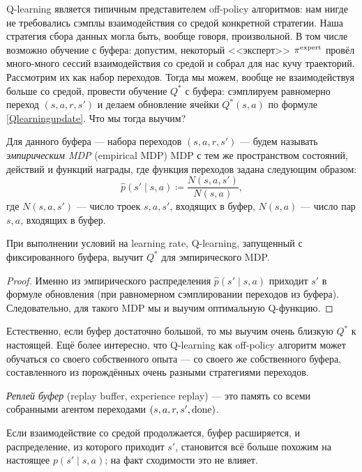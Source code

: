 Q-learning является типичным представителем off-policy алгоритмов: нам нигде не требовались сэмплы взаимодействия со средой конкретной стратегии. Наша стратегия сбора данных могла быть, вообще говоря, произвольной. В том числе возможно обучение с буфера: допустим, некоторый <<эксперт>> $\pi^{\mathrm{expert}}$ провёл много-много сессий взаимодействия со средой и собрал для нас кучу траекторий. Рассмотрим их как набор переходов. Тогда мы можем, вообще не взаимодействуя больше со средой, провести обучение $Q^*$ с буфера: сэмплируем равномерно переход $(s, a, r, s')$ и делаем обновление ячейки $Q^*(s, a)$ по формуле \eqref{Qlearningupdate}. Что мы тогда выучим?

\begin{definition}
Для данного буфера --- набора переходов $(s, a, r, s')$ --- будем называть \emph{эмпирическим MDP} (empirical MDP) MDP с тем же пространством состояний, действий и функций награды, где функция переходов задана следующим образом:
$$\hat{p}(s' \mid s, a) \coloneqq \frac{N(s, a, s')}{N(s, a)},$$
где $N(s, a, s')$ --- число троек $s, a, s'$, входящих в буфер, $N(s, a)$ --- число пар $s, a$, входящих в буфер.
\end{definition}

\begin{proposition}
При выполнении условий на learning rate, Q-learning, запущенный с фиксированного буфера, выучит $Q^*$ для эмпирического MDP.
\begin{proof}
Именно из эмпирического распределения $\hat{p}(s' \mid s, a)$ приходит $s'$ в формуле обновления (при равномерном сэмплировании переходов из буфера). Следовательно, для такого MDP мы и выучим оптимальную Q-функцию.
\end{proof}
\end{proposition}

Естественно, если буфер достаточно большой, то мы выучим очень близкую $Q^*$ к настоящей. Ещё более интересно, что Q-learning как off-policy алгоритм может обучаться со своего собственного опыта --- со своего же собственного буфера, составленного из порождённых очень разными стратегиями переходов. 

\begin{definition}
\emph{Реплей буфер} (replay buffer, experience replay) --- это память со всеми собранными агентом переходами $(s, a, r, s', \mathrm{done})$.
\end{definition}

Если взаимодействие со средой продолжается, буфер расширяется, и распределение, из которого приходит $s'$, становится всё больше похожим на настоящее $p(s' \mid s, a)$; на факт сходимости это не влияет.

